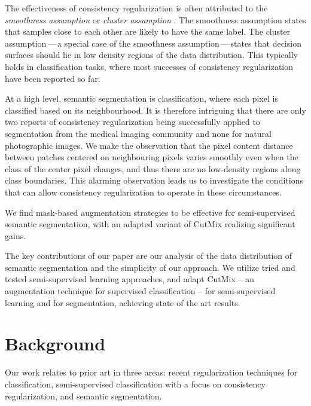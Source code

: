\documentclass{bmvc2k}
\begin{document}
The effectiveness of consistency regularization is often attributed to the \emph{smoothness assumption} \cite{Luo:SNTG} or \emph{cluster assumption} \cite{Chapelle:ClusterAssum,Sajjadi:Mutual,Shu:DIRTT,Verma:ICT}. The smoothness assumption states that samples close to each other are likely to have the same label. The cluster assumption\,---\,a special case of the smoothness assumption\,---\,states that decision surfaces should lie in low density regions of the data distribution. This typically holds in classification tasks, where most successes of consistency regularization have been reported so far.


At a high level, semantic segmentation is classification, where each pixel is classified based on its neighbourhood. It is therefore intriguing that there are only two reports of consistency regularization being successfully applied to segmentation from the medical imaging community \cite{Perone:SemiSupSeg,Li:SemiSupSkin} and none for natural photographic images.
We make the observation that the  pixel content distance between patches centered on
neighbouring pixels varies smoothly even when the class of the center pixel changes, and thus there are no low-density regions along class boundaries.
This alarming observation leads us to investigate the conditions that can allow consistency regularization to operate in these circumstances. 

We find mask-based augmentation strategies to be effective for semi-supervised semantic segmentation,
with an adapted variant of CutMix \cite{Yun:CutMix} realizing significant gains.

The key contributions of our paper are our analysis of the data distribution of semantic segmentation and the simplicity of our approach.
We utilize tried and tested semi-supervised learning approaches,
and adapt CutMix -- an augmentation technique for supervised classification -- for semi-supervised learning and for segmentation,
achieving state of the art results.






\section{Background}
\label{sec:background}

Our work relates to prior art in three areas: recent regularization techniques for classification, semi-supervised classification with a focus on consistency regularization, and semantic segmentation.
\end{document}
